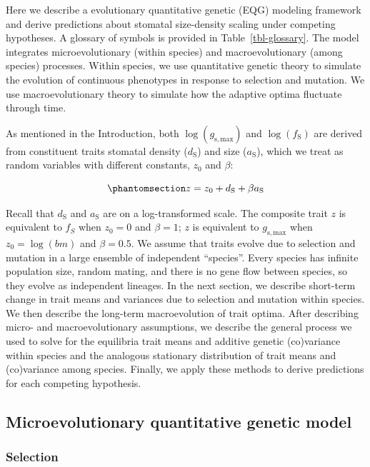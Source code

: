 \documentclass[
  letterpaper,
  DIV=11,
  numbers=noendperiod]{scrartcl}
\begin{document}
Here we describe a evolutionary quantitative genetic (EQG) modeling
framework and derive predictions about stomatal size-density scaling
under competing hypotheses. A glossary of symbols is provided in
Table~\ref{tbl-glossary}. The model integrates microevolutionary (within
species) and macroevolutionary (among species) processes. Within
species, we use quantitative genetic theory to simulate the evolution of
continuous phenotypes in response to selection and mutation. We use
macroevolutionary theory to simulate how the adaptive optima fluctuate
through time.

As mentioned in the Introduction, both \(\log (g_\mathrm{s,max})\) and
\(\log (f_\mathrm{S})\) are derived from constituent traits stomatal
density (\(d_\mathrm{S}\)) and size (\(a_\mathrm{S}\)), which we treat
as random variables with different constants, \(z_0\) and \(\beta\):

\begin{equation}\phantomsection\label{eq-z}{z = z_0 + d_\mathrm{S} + \beta a_\mathrm{S}}\end{equation}

Recall that \(d_\mathrm{S}\) and \(a_\mathrm{S}\) are on a
log-transformed scale. The composite trait \(z\) is equivalent to
\(f_S\) when \(z_0 = 0\) and \(\beta = 1\); \(z\) is equivalent to
\(g_\mathrm{s,max}\) when \(z_0 = \log(bm)\) and \(\beta = 0.5\). We
assume that traits evolve due to selection and mutation in a large
ensemble of independent ``species''. Every species has infinite
population size, random mating, and there is no gene flow between
species, so they evolve as independent lineages. In the next section, we
describe short-term change in trait means and variances due to selection
and mutation within species. We then describe the long-term
macroevolution of trait optima. After describing micro- and
macroevolutionary assumptions, we describe the general process we used
to solve for the equilibria trait means and additive genetic
(co)variance within species and the analogous stationary distribution of
trait means and (co)variance among species. Finally, we apply these
methods to derive predictions for each competing hypothesis.

\subsection{Microevolutionary quantitative genetic
model}\label{microevolutionary-quantitative-genetic-model}

\subsubsection{Selection}\label{selection}
\end{document}
